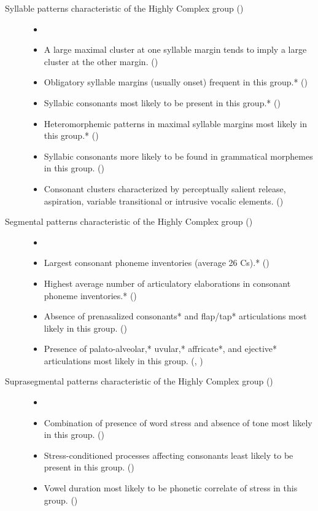 \begin{description}
\item[Syllable patterns characteristic of the Highly Complex group ()]
\begin{itemize}[leftmargin=*]
\item[]
\item A large maximal cluster at one syllable margin tends to imply a large cluster at the other margin. {()}
\item Obligatory syllable margins (usually onset) frequent in this group.* {()}
\item Syllabic consonants most likely to be present in this group.* {()}
\item Heteromorphemic patterns in maximal syllable margins most likely in this group.* {()}
\item Syllabic consonants more likely to be found in grammatical morphemes in this group. {()}
\item Consonant clusters characterized by perceptually salient release, aspiration, variable transitional or intrusive vocalic elements. {()}
\end{itemize}

\item[Segmental patterns characteristic of the Highly Complex group ()]

\begin{itemize}[leftmargin=*]
\item[]
\item Largest consonant phoneme inventories (average 26 Cs).* {()}
\item Highest average number of articulatory elaborations in consonant phoneme inventories.* ()
\item Absence of prenasalized consonants* and flap/tap* articulations most likely in this group. {()}
\item Presence of palato-alveolar,* uvular,* affricate*, and ejective* articulations most likely in this group. {(, )}
\end{itemize}

\item[Suprasegmental patterns characteristic of the Highly Complex group ()]

\begin{itemize}[leftmargin=*]
\item[]
\item Combination of presence of word stress and absence of tone most likely in this group. {()}
\item Stress-conditioned processes affecting consonants least likely to be present in this group. ()
\item Vowel duration most likely to be phonetic correlate of stress in this group. {()}
\end{itemize}


\end{description}
